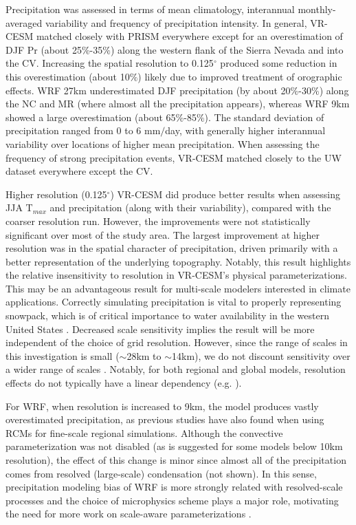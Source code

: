 Precipitation was assessed in terms of mean climatology, interannual monthly-averaged variability and frequency of precipitation intensity.  In general, VR-CESM matched closely with PRISM everywhere except for an  overestimation of DJF Pr (about 25$\%$-35$\%$) along the western flank of the Sierra Nevada and into the CV. Increasing the spatial resolution to 0.125$^\circ$ produced some reduction in this overestimation (about 10$\%$) likely due to improved treatment of orographic effects. WRF 27km underestimated DJF precipitation (by about 20$\%$-30$\%$) along the NC and MR (where almost all the precipitation appears), whereas WRF 9km showed a large overestimation (about 65$\%$-85$\%$). The standard deviation of precipitation ranged from 0 to 6 mm$/$day, with generally higher interannual variability over locations of higher mean precipitation. When assessing the frequency of strong precipitation events, VR-CESM matched closely to the UW dataset everywhere except the CV.

Higher resolution (0.125$^\circ$) VR-CESM did produce better results when assessing JJA T$_{max}$ and precipitation (along with their variability), compared with the coarser resolution run. However, the improvements were not statistically significant over most of the study area.  The largest improvement at higher resolution was in the spatial character of precipitation, driven primarily with a better representation of the underlying topography. Notably, this result highlights the relative insensitivity to resolution in VR-CESM's physical parameterizations. This may be an advantageous result for multi-scale modelers interested in climate applications. Correctly simulating precipitation is vital to properly representing snowpack, which is of critical importance to water availability in the western United States \cite{bales2006mountain, wise2012hydroclimatology, rhoades2015characterizing}. Decreased scale sensitivity implies the result will be more independent of the choice of grid resolution. However, since the range of scales in this investigation is small ($\sim$28km to $\sim$14km), we do not discount sensitivity over a wider range of scales \cite{wehner2010effect, rauscher2010resolution}. Notably, for both regional and global models, resolution effects do not typically have a linear dependency (e.g. \cite{hughes2014landfall, wehner2014effect}).

For WRF, when resolution is increased to 9km, the model produces vastly overestimated precipitation, as previous studies have also found when using RCMs for fine-scale regional simulations. Although the convective parameterization was not disabled (as is suggested for some models below 10km resolution), the effect of this change is minor since almost all of the precipitation comes from resolved (large-scale) condensation (not shown). In this sense, precipitation modeling bias of WRF is more strongly related with resolved-scale processes and the choice of microphysics scheme plays a major role, motivating the need for more work on scale-aware parameterizations \cite{o2013observed}. 

